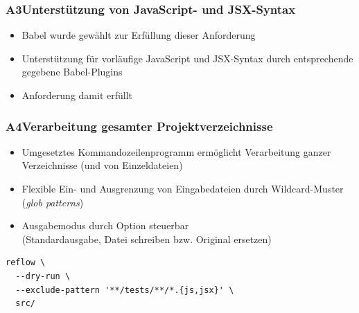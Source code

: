       \begin{frame}
        \frametitle{A3\hspace{0.75em}Unterstützung von JavaScript- und JSX-Syntax}
        \begin{itemize}
          \item Babel wurde gewählt zur Erfüllung dieser Anforderung
          \item Unterstützung für vorläufige JavaScript und JSX-Syntax durch entsprechende gegebene Babel-Plugins
          \item Anforderung damit erfüllt
        \end{itemize}
      \end{frame}

      \begin{frame}[fragile]
        \frametitle{A4\hspace{0.75em}Verarbeitung gesamter Projektverzeichnisse}
        \begin{itemize}
          \item Umgesetztes Kommandozeilenprogramm ermöglicht Verarbeitung ganzer Verzeichnisse (und von Einzeldateien)
          \item Flexible Ein- und Ausgrenzung von Eingabedateien durch Wildcard-Muster (\textit{glob patterns})
          \item Ausgabemodus durch Option steuerbar\\(Standardausgabe, Datei schreiben bzw. Original ersetzen)
        \end{itemize}

        \bigskip
        \begin{lstlisting}[numbers=none]
reflow \
  --dry-run \
  --exclude-pattern '**/tests/**/*.{js,jsx}' \
  src/
        \end{lstlisting}
      \end{frame}

